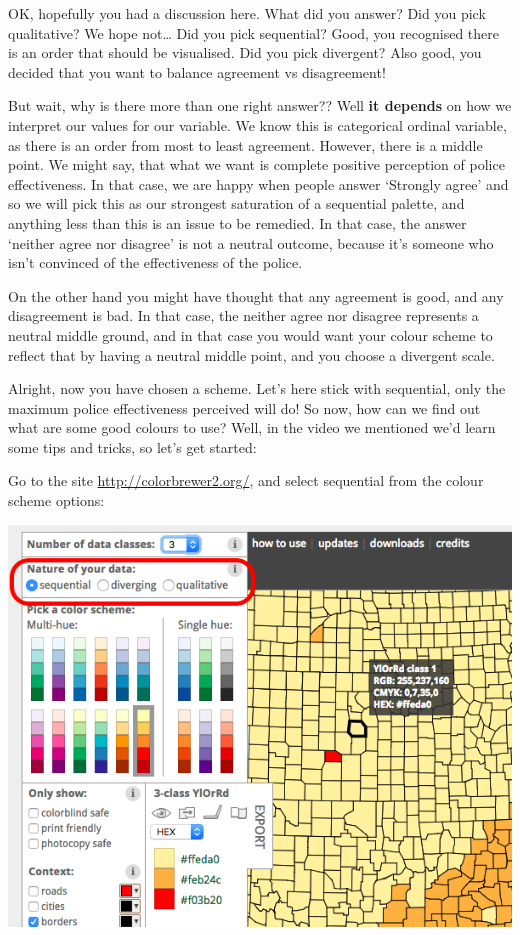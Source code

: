 \documentclass[
]{book}
\begin{document}
OK, hopefully you had a discussion here. What did you answer? Did you pick qualitative? We hope not\ldots{} Did you pick sequential? Good, you recognised there is an order that should be visualised. Did you pick divergent? Also good, you decided that you want to balance agreement vs disagreement!

But wait, why is there more than one right answer?? Well \textbf{it depends} on how we interpret our values for our variable. We know this is categorical ordinal variable, as there is an order from most to least agreement. However, there is a middle point. We might say, that what we want is complete positive perception of police effectiveness. In that case, we are happy when people answer `Strongly agree' and so we will pick this as our strongest saturation of a sequential palette, and anything less than this is an issue to be remedied. In that case, the answer `neither agree nor disagree' is not a neutral outcome, because it's someone who isn't convinced of the effectiveness of the police.

On the other hand you might have thought that any agreement is good, and any disagreement is bad. In that case, the neither agree nor disagree represents a neutral middle ground, and in that case you would want your colour scheme to reflect that by having a neutral middle point, and you choose a divergent scale.

Alright, now you have chosen a scheme. Let's here stick with sequential, only the maximum police effectiveness perceived will do! So now, how can we find out what are some good colours to use? Well, in the video we mentioned we'd learn some tips and tricks, so let's get started:

Go to the site \url{http://colorbrewer2.org/}, and select sequential from the colour scheme options:

\includegraphics{imgs/choose_col_vartyp.png}
\end{document}
